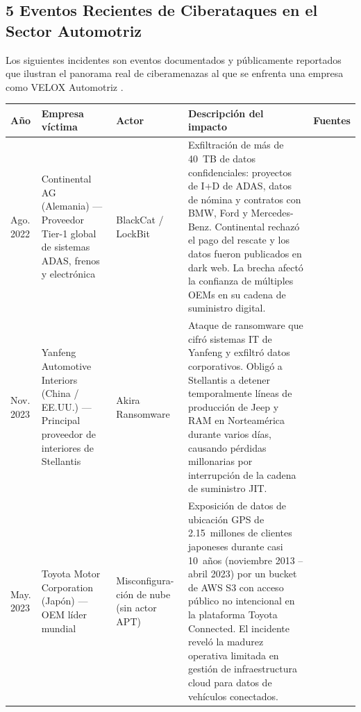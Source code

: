 \documentclass[letterpaper,11pt]{article}
\begin{document}
\subsection{5 Eventos Recientes de Ciberataques en el Sector Automotriz}

Los siguientes incidentes son eventos documentados y públicamente reportados que ilustran el panorama real de ciberamenazas al que se enfrenta una empresa como VELOX Automotriz \autocite{upstream-security-report, enisa-automotive-2023}.

\vspace{0.2cm}
\begingroup\footnotesize
{}
\begin{tabular}{|p{1.2cm}|p{2.5cm}|p{2.0cm}|p{5.5cm}|p{2.3cm}|}
\hline
\rowcolor{red!20}
\textbf{Año} & \textbf{Empresa víctima} & \textbf{Actor} & \textbf{Descripción del impacto} & \textbf{Fuentes} \\
\hline
Ago. 2022 &
  Continental AG (Alemania) --- Proveedor Tier-1 global de sistemas ADAS, frenos y electrónica &
  BlackCat / LockBit &
  Exfiltración de más de 40~TB de datos confidenciales: proyectos de I+D de ADAS, datos de nómina y contratos con BMW, Ford y Mercedes-Benz. Continental rechazó el pago del rescate y los datos fueron publicados en dark web. La brecha afectó la confianza de múltiples OEMs en su cadena de suministro digital. &
  \autocite{bleepingcomputer-continental, securityweek-continental} \\
\hline
Nov. 2023 &
  Yanfeng Automotive Interiors (China / EE.UU.) --- Principal proveedor de interiores de Stellantis &
  Akira Ransomware &
  Ataque de ransomware que cifró sistemas IT de Yanfeng y exfiltró datos corporativos. Obligó a Stellantis a detener temporalmente líneas de producción de Jeep y RAM en Norteamérica durante varios días, causando pérdidas millonarias por interrupción de la cadena de suministro JIT. &
  \autocite{bleepingcomputer-yanfeng, therecord-yanfeng} \\
\hline
May. 2023 &
  Toyota Motor Corporation (Japón) --- OEM líder mundial &
  Misconfigura-ción de nube (sin actor APT) &
  Exposición de datos de ubicación GPS de 2.15~millones de clientes japoneses durante casi 10~años (noviembre 2013 -- abril 2023) por un bucket de AWS S3 con acceso público no intencional en la plataforma Toyota Connected. El incidente reveló la madurez operativa limitada en gestión de infraestructura cloud para datos de vehículos conectados. &

\end{tabular}
\end{document}
